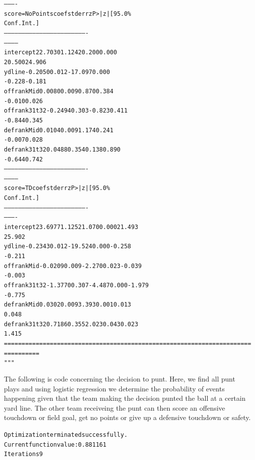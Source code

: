 \documentclass[letterpaper,10pt,english]{/anaconda/lib/python2.7/site-packages/sphinx/texinputs/sphinxhowto}
\newenvironment{InvisibleVerbatim}
        {\begin{mdframed}[leftmargin=0.1\linewidth,innerleftmargin=3pt,innerrightmargin=3pt, userdefinedwidth=1\linewidth, linewidth=0pt, linecolor=white, usetwoside=false]}
        {\end{mdframed}}
\begin{document}
\begin{InvisibleVerbatim}
\begin{alltt}
----------
score=NoPoints       coef    std err          z      P>|z|      [95.0\%
Conf. Int.]
----------------------------------------------------------------------
------------
intercept         22.7030      1.124     20.200      0.000
20.500    24.906
ydline            -0.2050      0.012    -17.097      0.000
-0.228    -0.181
offrankMid         0.0080      0.009      0.870      0.384
-0.010     0.026
offrank31t32      -0.2494      0.303     -0.823      0.411
-0.844     0.345
defrankMid         0.0104      0.009      1.174      0.241
-0.007     0.028
defrank31t32       0.0488      0.354      0.138      0.890
-0.644     0.742
----------------------------------------------------------------------
------------
    score=TD       coef    std err          z      P>|z|      [95.0\%
Conf. Int.]
----------------------------------------------------------------------
----------
intercept       23.6977      1.125     21.070      0.000        21.493
25.902
ydline          -0.2343      0.012    -19.524      0.000        -0.258
-0.211
offrankMid      -0.0209      0.009     -2.270      0.023        -0.039
-0.003
offrank31t32    -1.3770      0.307     -4.487      0.000        -1.979
-0.775
defrankMid       0.0302      0.009      3.393      0.001         0.013
0.048
defrank31t32     0.7186      0.355      2.023      0.043         0.023
1.415
======================================================================
==========
"""\end{alltt}

            \end{InvisibleVerbatim}
            
        
    

The following is code concerning the decision to punt. Here, we find all
punt plays and using logistic regression we determine the probability of
events happening given that the team making the decision punted the ball
at a certain yard line. The other team receiveing the punt can then
score an offensive touchdown or field goal, get no points or give up a
defensive touchdown or safety.

    

        
        

            
                \begin{InvisibleVerbatim}
                \vspace{-0.5\baselineskip}
\begin{alltt}Optimization terminated successfully.
         Current function value: 0.881161
         Iterations 9
\end{alltt}

            \end{InvisibleVerbatim}
            
\end{document}
